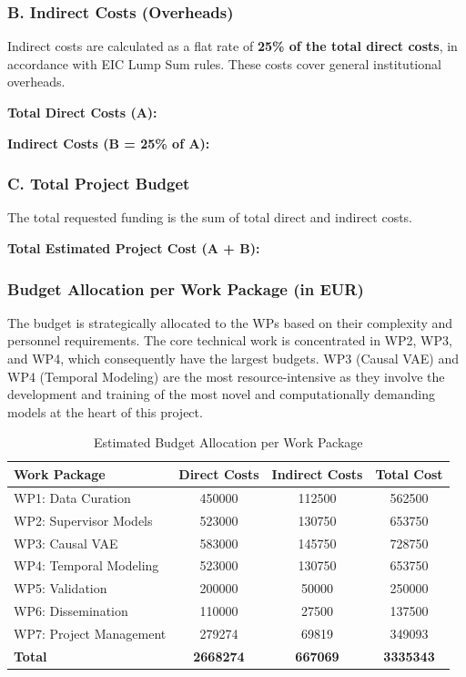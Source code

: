 \documentclass[11pt, a4paper]{article}
\begin{document}
\subsubsection*{B. Indirect Costs (Overheads)}
Indirect costs are calculated as a flat rate of \textbf{25\% of the total direct costs}, in accordance with EIC Lump Sum rules. These costs cover general institutional overheads.

\textbf{Total Direct Costs (A): }

\textbf{Indirect Costs (B = 25\% of A): }

\subsubsection*{C. Total Project Budget}
The total requested funding is the sum of total direct and indirect costs.

\textbf{Total Estimated Project Cost (A + B):} 

\subsubsection*{Budget Allocation per Work Package (in EUR)}
The budget is strategically allocated to the WPs based on their complexity and personnel requirements. The core technical work is concentrated in WP2, WP3, and WP4, which consequently have the largest budgets. WP3 (Causal VAE) and WP4 (Temporal Modeling) are the most resource-intensive as they involve the development and training of the most novel and computationally demanding models at the heart of this project.

\begin{table}[H]
\centering
\caption{Estimated Budget Allocation per Work Package}
\label{tab:budget_wp}
\begin{tabular}{lS[table-format=7.0]S[table-format=6.0]S[table-format=7.0]}
\toprule
\textbf{Work Package} & {\textbf{Direct Costs}} & {\textbf{Indirect Costs}} & {\textbf{Total Cost}} \\
\midrule
WP1: Data Curation & 450000 & 112500 & 562500 \\
WP2: Supervisor Models & 523000 & 130750 & 653750 \\
WP3: Causal VAE & 583000 & 145750 & 728750 \\
WP4: Temporal Modeling & 523000 & 130750 & 653750 \\
WP5: Validation & 200000 & 50000 & 250000 \\
WP6: Dissemination & 110000 & 27500 & 137500 \\
WP7: Project Management & 279274 & 69819 & 349093 \\
\midrule
\textbf{Total} & {\textbf{2668274}} & {\textbf{667069}} & {\textbf{3335343}} \\
\bottomrule
\end{tabular}
\end{table}
\end{document}
